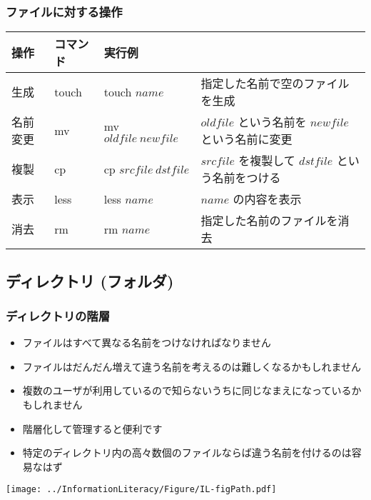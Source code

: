 \begin{frame}
\frametitle{ファイルに対する操作}
\scriptsize
  \begin{tabular}{l|l|lp{4cm}}
操作 & コマンド & 実行例 & \\\hline
生成 & touch & touch $name$ & 指定した名前で空のファイルを生成\\
名前変更 & mv & mv $oldfile\ newfile$ & $oldfile$ という名前を $newfile$ という名前に変更\\
複製 & cp & cp $srcfile\ dstfile$ & $srcfile$ を複製して $dstfile$ という名前をつける\\
表示 & less & less $name$ & $name$ の内容を表示\\
消去 & rm & rm $name$ & 指定した名前のファイルを消去
  \end{tabular}
\end{frame}
\subsection{ディレクトリ (フォルダ)}
\begin{frame}
\frametitle{ディレクトリの階層}
  \begin{itemize}
\footnotesize
\item ファイルはすべて異なる名前をつけなければなりません
\item ファイルはだんだん増えて違う名前を考えるのは難しくなるかもしれません
\item 複数のユーザが利用しているので知らないうちに同じなまえになっているかもしれません
\item 階層化して管理すると便利です
\item 特定のディレクトリ内の高々数個のファイルならば違う名前を付けるのは容易なはず
  \end{itemize}
  \begin{center}
\texttt{[image: ../InformationLiteracy/Figure/IL-figPath.pdf]}
  \end{center}
\end{frame}
